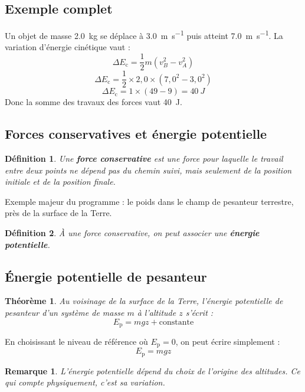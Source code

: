 \documentclass[11pt,a4paper]{article}
\newtheorem{definition}{Définition}[section]
\newtheorem{theoreme}{Théorème}[section]
\newtheorem{remarque}{Remarque}[section]
\newcommand{\Ec}{E_\mathrm{c}}
\newcommand{\Ep}{E_\mathrm{p}}
\begin{document}
\subsection{Exemple complet}

Un objet de masse \SI{2,0}{kg} se déplace à \SI{3,0}{m.s^{-1}} puis atteint \SI{7,0}{m.s^{-1}}.  
La variation d'énergie cinétique vaut :
\[
\Delta \Ec=\frac12 m(v_B^2-v_A^2)
\]
\[
\Delta \Ec=\frac12 \times 2,0 \times (7,0^2-3,0^2)
\]
\[
\Delta \Ec=1\times (49-9)=40\ \si{J}
\]
Donc la somme des travaux des forces vaut \SI{40}{J}.

\subsection{Forces conservatives et énergie potentielle}

\begin{definition}
Une \textbf{force conservative} est une force pour laquelle le travail entre deux points ne dépend pas du chemin suivi, mais seulement de la position initiale et de la position finale.
\end{definition}

Exemple majeur du programme : le poids dans le champ de pesanteur terrestre, près de la surface de la Terre.

\begin{definition}
À une force conservative, on peut associer une \textbf{énergie potentielle}.
\end{definition}

\subsection{Énergie potentielle de pesanteur}

\begin{theoreme}
Au voisinage de la surface de la Terre, l'énergie potentielle de pesanteur d'un système de masse $m$ à l'altitude $z$ s'écrit :
\[
\Ep = mgz + \text{constante}
\]
\end{theoreme}

En choisissant le niveau de référence où $\Ep=0$, on peut écrire simplement :
\[
\Ep = mgz
\]

\begin{remarque}
L'énergie potentielle dépend du choix de l'origine des altitudes.  
Ce qui compte physiquement, c'est sa variation.
\end{remarque}
\end{document}
